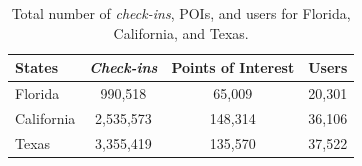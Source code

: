 \begin{table}[htbp]
\centering
\caption{Total number of \textit{check-ins}, POIs, and users for Florida, California, and Texas.}
\label{tab:courb:dataset}
\begin{tabular}{lccc}
\toprule
States & \textit{Check-ins} & Points of Interest & Users \\
\midrule
Florida & 990,518 & 65,009 & 20,301 \\
California & 2,535,573 & 148,314 & 36,106 \\
Texas & 3,355,419 & 135,570 & 37,522 \\
\bottomrule
\end{tabular}
\end{table}
